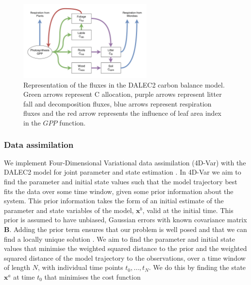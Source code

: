 \documentclass[draft,linenumbers]{agujournal}
\begin{document}
\begin{figure}[ht]
    \centering
    \includegraphics[width=0.6\textwidth]{dalec2diag.pdf}
    \caption{Representation of the fluxes in the DALEC2 carbon balance model. Green arrows represent C allocation, purple arrows represent litter fall and decomposition fluxes, blue arrows represent respiration fluxes and the red arrow represents the influence of leaf area index in the $GPP$ function.} \label{fig:DALEC_mod}
\end{figure}

\subsubsection{Data assimilation} \label{sec:da}

We implement Four-Dimensional Variational data assimilation (4D-Var) with the DALEC2 model for joint parameter and state estimation \citep{navon1998practical}. In 4D-Var we aim to find the parameter and initial state values such that the model trajectory best fits the data over some time window, given some prior information about the system. This prior information takes the form of an initial estimate of the parameter and state variables of the model, $\textbf{x}^{b}$, valid at the initial time. This prior is assumed to have unbiased, Gaussian errors with known covariance matrix $\textbf{B}$. Adding the prior term ensures that our problem is well posed and that we can find a locally unique solution \citep{Tremolet2006}. We aim to find the parameter and initial state values that minimise the weighted squared distance to the prior and the weighted squared distance of the model trajectory to the observations, over a time window of length \(N\), with individual time points $t_{0}, \dots, t_{N}$. We do this by finding the state $\textbf{x}^{a}$ at time $t_{0}$ that minimises the cost function
\end{document}
